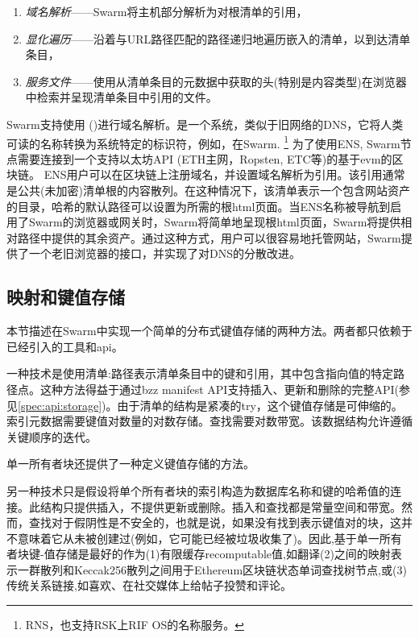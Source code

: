 \begin{enumerate}
    \item \emph{域名解析}——Swarm将主机部分解析为对根清单的引用，
    \item \emph{显化遍历}——沿着与URL路径匹配的路径递归地遍历嵌入的清单，以到达清单条目，
    \item \emph{服务文件}——使用从清单条目的元数据中获取的头(特别是内容类型)在浏览器中检索并呈现清单条目中引用的文件。
\end{enumerate}

Swarm支持使用 ()进行域名解析。是一个系统，类似于旧网络的DNS，它将人类可读的名称转换为系统特定的标识符，例如，在Swarm.%
\footnote{RNS，也支持RSK上RIF OS的名称服务。}
%
为了使用ENS, Swarm节点需要连接到一个支持以太坊API (ETH主网，Ropsten, ETC等)的基于evm的区块链。 
ENS用户可以在区块链上注册域名，并设置域名解析为引用。该引用通常是公共(未加密)清单根的内容散列。在这种情况下，该清单表示一个包含网站资产的目录，哈希的默认路径可以设置为所需的根html页面。当ENS名称被导航到启用了Swarm的浏览器或网关时，Swarm将简单地呈现根html页面，Swarm将提供相对路径中提供的其余资产。通过这种方式，用户可以很容易地托管网站，Swarm提供了一个老旧浏览器的接口，并实现了对DNS的分散改进。


\subsection{映射和键值存储\statusgreen}\label{sec:maps}

本节描述在Swarm中实现一个简单的分布式键值存储的两种方法。两者都只依赖于已经引入的工具和api。

一种技术是使用清单:路径表示清单条目中的键和引用，其中包含指向值的特定路径点。这种方法得益于通过bzz manifest API支持插入、更新和删除的完整API(参见\ref{spec:api:storage})。由于清单的结构是紧凑的try，这个键值存储是可伸缩的。索引元数据需要键值对数量的对数存储。查找需要对数带宽。该数据结构允许遵循关键顺序的迭代。

单一所有者块还提供了一种定义键值存储的方法。

另一种技术只是假设将单个所有者块的索引构造为数据库名称和键的哈希值的连接。此结构只提供插入，不提供更新或删除。插入和查找都是常量空间和带宽。然而，查找对于假阴性是不安全的，也就是说，如果没有找到表示键值对的块，这并不意味着它从未被创建过(例如，它可能已经被垃圾收集了)。因此,基于单一所有者块键-值存储是最好的作为(1)有限缓存recomputable值,如翻译(2)之间的映射表示一群散列和Keccak256散列之间用于Ethereum区块链状态单词查找树节点,或(3)传统关系链接,如喜欢、在社交媒体上给帖子投赞和评论。 


